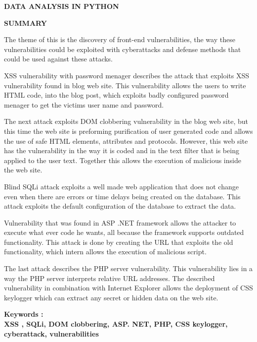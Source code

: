 

\newpage
\setlength{\parindent}{0in}

\begin{center}
	{\LARGE\bf{DATA ANALYSIS IN PYTHON}}
\end{center}
\vskip 10mm

{\fontsize{14}{18}\bf {SUMMARY}}

\vskip 15mm
\textnormal{
The theme of this is the discovery of front-end vulnerabilities, the way these vulnerabilities could be exploited with cyberattacks and defense methods that could be used against these attacks.}

\textnormal{
XSS vulnerability with password menager describes the attack that exploits  XSS vulnerability found in blog web site. This vulnerability allows the users to write HTML code, into the blog post, which exploits badly configured password menager to get the victims user name and password.}

\textnormal{
The next attack exploits DOM clobbering vulnerability in the blog web site, but this time the web site is preforming purification of user generated code and allows the use of safe HTML elements, attributes and protocols. However, this web site has the vulnerability in the way it is coded and in the text filter that is being applied to the user text. Together this allows the execution of malicious inside the web site.}

\textnormal{
Blind SQLi attack exploits a well made web application that does not change even when there are errors or time delays being created on the database. This attack exploits the default configuration of the database to extract the data.}

\textnormal{
Vulnerability that was found in ASP .NET framework allows the attacker to execute what ever code he wants, all because the framework supports outdated functionality. This attack is done by creating the URL that exploits the old functionality, which intern allows the execution of malicious script.}

\textnormal{
The last attack describes the PHP server vulnerability. This vulnerability lies in a way the PHP server interprets relative URL addresses. The described vulnerability in combination with Internet Explorer allows the deployment of CSS keylogger which can extract any secret or hidden data on the web site.}

\vskip 15mm
\bf{Keywords  :\\}
\textnormal{XSS , SQLi, DOM clobbering, ASP. NET, PHP, CSS keylogger, cyberattack, vulnerabilities}
